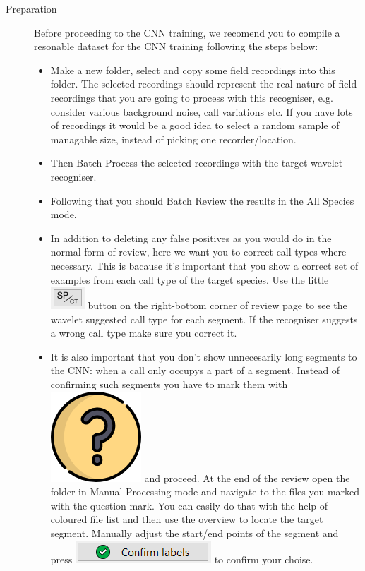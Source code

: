 \documentclass{article}
\begin{document}
\begin{description}
\item[Preparation]Before proceeding to the CNN training, we recomend you to compile a resonable dataset for the CNN training following the steps below:
\begin{itemize}
\item Make a new folder, select and copy some field recordings into this folder. The selected recordings should represent the real nature of field recordings that you are going to process with this recogniser, e.g. consider various background noise, call variations etc. If you have lots of recordings it would be a good idea to select a random sample of managable size, instead of picking one recorder/location.
\item Then Batch Process the selected recordings with the target wavelet recogniser.
\item Following that you should Batch Review the results in the All Species mode. 
\item In addition to deleting any false positives as you would do in the normal form of review, here we want you to correct call types where necessary. This is bacause it's important that you show a correct set of examples from each call type of the target species. Use the little \includegraphics[scale=0.5]{Figs/SPCT} button on the right-bottom corner of review page to see the wavelet suggested call type for each segment. If the recogniser suggests a wrong call type make sure you correct it.
\item It is also important that you don't show unnecesarily long segments to the CNN: when a call only occupys a part of a segment. Instead of confirming such segments you have to mark them with \includegraphics[scale=0.025]{Figs/questionL} and proceed. At the end of the review open the folder in Manual Processing mode and navigate to the files you marked with the question mark. You can easily do that with the help of coloured file list and then use the overview to locate the target segment. Manually adjust the start/end points of the segment and press \includegraphics[scale=0.5]{Figs/confirmlabels} to confirm your choise.

\end{itemize}
\end{description}
\end{document}
